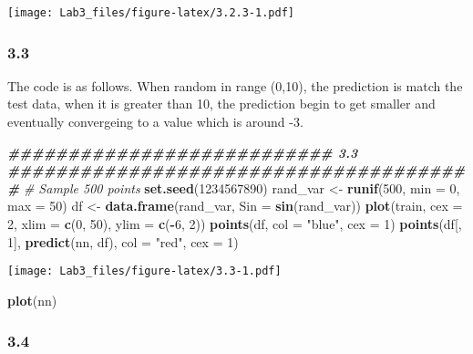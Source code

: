 \documentclass[
]{article}
\newenvironment{Shaded}{\begin{snugshade}}{\end{snugshade}}
\newcommand{\AttributeTok}[1]{\textcolor[rgb]{0.13,0.29,0.53}{#1}}
\newcommand{\CommentTok}[1]{\textcolor[rgb]{0.56,0.35,0.01}{\textit{#1}}}
\newcommand{\DecValTok}[1]{\textcolor[rgb]{0.00,0.00,0.81}{#1}}
\newcommand{\DocumentationTok}[1]{\textcolor[rgb]{0.56,0.35,0.01}{\textbf{\textit{#1}}}}
\newcommand{\FunctionTok}[1]{\textcolor[rgb]{0.13,0.29,0.53}{\textbf{#1}}}
\newcommand{\NormalTok}[1]{#1}
\newcommand{\OtherTok}[1]{\textcolor[rgb]{0.56,0.35,0.01}{#1}}
\newcommand{\SpecialCharTok}[1]{\textcolor[rgb]{0.81,0.36,0.00}{\textbf{#1}}}
\newcommand{\StringTok}[1]{\textcolor[rgb]{0.31,0.60,0.02}{#1}}
\begin{document}
\texttt{[image: Lab3\_files/figure-latex/3.2.3-1.pdf]}

\subsubsection{3.3}\label{section-2}

The code is as follows. When random in range (0,10), the prediction is
match the test data, when it is greater than 10, the prediction begin to
get smaller and eventually convergeing to a value which is around -3.

\begin{Shaded}
\begin{Highlighting}[]
\DocumentationTok{\#\#\#\#\#\#\#\#\#\#\#\#\#\#\#\#\#\#\#\#\#\#\#\#\#\#\#  3.3  \#\#\#\#\#\#\#\#\#\#\#\#\#\#\#\#\#\#\#\#\#\#\#\#\#\#\#\#\#\#\#\#\#\#\#\#\#\#\#}
\CommentTok{\# Sample 500 points}
\FunctionTok{set.seed}\NormalTok{(}\DecValTok{1234567890}\NormalTok{)}
\NormalTok{rand\_var }\OtherTok{\textless{}{-}} \FunctionTok{runif}\NormalTok{(}\DecValTok{500}\NormalTok{, }\AttributeTok{min =} \DecValTok{0}\NormalTok{, }\AttributeTok{max =} \DecValTok{50}\NormalTok{) }
\NormalTok{df }\OtherTok{\textless{}{-}} \FunctionTok{data.frame}\NormalTok{(rand\_var, }\AttributeTok{Sin =} \FunctionTok{sin}\NormalTok{(rand\_var))}
\FunctionTok{plot}\NormalTok{(train, }\AttributeTok{cex =} \DecValTok{2}\NormalTok{, }\AttributeTok{xlim =} \FunctionTok{c}\NormalTok{(}\DecValTok{0}\NormalTok{, }\DecValTok{50}\NormalTok{), }\AttributeTok{ylim =} \FunctionTok{c}\NormalTok{(}\SpecialCharTok{{-}}\DecValTok{6}\NormalTok{, }\DecValTok{2}\NormalTok{))}
\FunctionTok{points}\NormalTok{(df, }\AttributeTok{col =} \StringTok{"blue"}\NormalTok{, }\AttributeTok{cex =} \DecValTok{1}\NormalTok{)}
\FunctionTok{points}\NormalTok{(df[, }\DecValTok{1}\NormalTok{], }\FunctionTok{predict}\NormalTok{(nn, df), }\AttributeTok{col =} \StringTok{"red"}\NormalTok{, }\AttributeTok{cex =} \DecValTok{1}\NormalTok{)}
\end{Highlighting}
\end{Shaded}

\texttt{[image: Lab3\_files/figure-latex/3.3-1.pdf]}

\begin{Shaded}
\begin{Highlighting}[]
\FunctionTok{plot}\NormalTok{(nn)}
\end{Highlighting}
\end{Shaded}

\subsubsection{3.4}\label{section-3}
\end{document}
